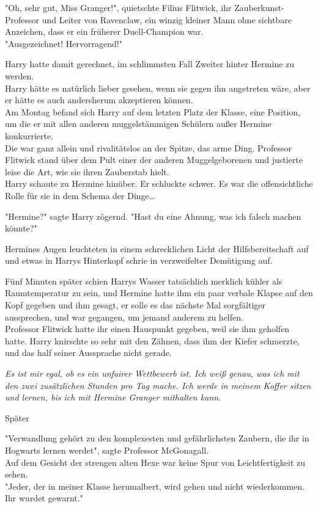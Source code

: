 {"Oh, sehr gut, Miss Granger!", quietschte Filius Flitwick, ihr Zauberkunst-Professor und Leiter von Ravenclaw, ein winzig kleiner Mann ohne sichtbare Anzeichen, dass er ein früherer Duell-Champion war.\\ "Ausgezeichnet! Hervorragend!"

Harry hatte damit gerechnet, im schlimmsten Fall Zweiter hinter Hermine zu werden.\\ Harry hätte es natürlich lieber gesehen, wenn sie gegen ihn angetreten wäre, aber er hätte es auch andersherum akzeptieren können.\\ Am Montag befand sich Harry auf dem letzten Platz der Klasse, eine Position, um die er mit allen anderen muggelstämmigen Schülern außer Hermine konkurrierte.\\ Die war ganz allein und rivalitätslos an der Spitze, das arme Ding. Professor Flitwick stand über dem Pult einer der anderen Muggelgeborenen und justierte leise die Art, wie sie ihren Zauberstab hielt.\\ Harry schaute zu Hermine hinüber. Er schluckte schwer. Es war die offensichtliche Rolle für sie in dem Schema der Dinge…

"Hermine?" sagte Harry zögernd. "Hast du eine Ahnung, was ich falsch machen könnte?"

Hermines Augen leuchteten in einem schrecklichen Licht der Hilfsbereitschaft auf und etwas in Harrys Hinterkopf schrie in verzweifelter Demütigung auf.

Fünf Minuten später schien Harrys Wasser tatsächlich merklich kühler als Raumtemperatur zu sein, und Hermine hatte ihm ein paar verbale Klapse auf den Kopf gegeben und ihm gesagt, er solle es das nächste Mal sorgfältiger aussprechen, und war gegangen, um jemand anderem zu helfen.\\ Professor Flitwick hatte ihr einen Hauspunkt gegeben, weil sie ihm geholfen hatte. Harry knirschte so sehr mit den Zähnen, dass ihm der Kiefer schmerzte, und das half seiner Aussprache nicht gerade.

\emph{Es ist mir egal, ob es ein unfairer Wettbewerb ist. Ich weiß genau, was ich mit den zwei zusätzlichen Stunden pro Tag mache. Ich werde in meinem Koffer sitzen und lernen, bis ich mit Hermine Granger mithalten kann.}

Später

"Verwandlung gehört zu den komplexesten und gefährlichsten Zaubern, die ihr in Hogwarts lernen werdet", sagte Professor McGonagall.\\ Auf dem Gesicht der strengen alten Hexe war keine Spur von Leichtfertigkeit zu sehen.\\ "Jeder, der in meiner Klasse herumalbert, wird gehen und nicht wiederkommen.\\ Ihr wurdet gewarnt."

}
